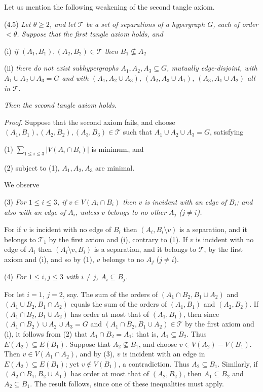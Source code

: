 Let us mention the following weakening of the second tangle axiom.

\stmt
(4.5) \textit{Let $\theta \ge 2$, and let $\mathscr{T}$ be a set of separations of a hypergraph $G$, each of order $< \theta$. Suppose that the first tangle axiom holds, and}

\hspace*{12pt}(i) \textit{if $(A_1, B_1), (A_2, B_2) \in \mathscr{T}$ then $B_1 \not\subseteq A_2$}

\hspace*{12pt}(ii) \textit{there do not exist subhypergraphs $A_1, A_2, A_3 \subseteq G$, mutually edge-disjoint, with $A_1 \cup A_2 \cup A_3 = G$ and with $(A_1, A_2 \cup A_3)$, $(A_2, A_3 \cup A_1)$, $(A_3, A_1 \cup A_2)$ all in $\mathscr{T}$.}

\textit{Then the second tangle axiom holds.}

\textit{Proof.} Suppose that the second axiom fails, and choose $(A_1, B_1), (A_2, B_2), (A_3, B_3) \in \mathscr{T}$ such that $A_1 \cup A_2 \cup A_3 = G$, satisfying

\hspace*{12pt}(1) $\sum_{1 \le i \le 3} |V(A_i \cap B_i)|$ is minimum, and

\hspace*{12pt}(2) subject to (1), $A_1, A_2, A_3$ are minimal.

We observe

\hspace*{12pt}(3) \textit{For $1 \le i \le 3$, if $v \in V(A_i \cap B_i)$ then $v$ is incident with an edge of $B_i$; and also with an edge of $A_i$, unless $v$ belongs to no other $A_j$ ($j \ne i$).}

For if $v$ is incident with no edge of $B_i$ then $(A_i, B_i \setminus v)$ is a separation, and it belongs to $\mathscr{T}_1$ by the first axiom and (i), contrary to (1). If $v$ is incident with no edge of $A_i$ then $(A_i \setminus v, B_i)$ is a separation, and it belongs to $\mathscr{T}$, by the first axiom and (i), and so by (1), $v$ belongs to no $A_j$ ($j \ne i$).

\hspace*{12pt}(4) \textit{For $1 \le i, j \le 3$ with $i \ne j$, $A_i \subseteq B_j$.}

For let $i = 1$, $j = 2$, say. The sum of the orders of $(A_1 \cap B_2, B_1 \cup A_2)$ and $(A_1 \cup B_2, B_1 \cap A_2)$ equals the sum of the orders of $(A_1, B_1)$ and $(A_2, B_2)$. If $(A_1 \cap B_2, B_1 \cup A_2)$ has order at most that of $(A_1, B_1)$, then since $(A_1 \cap B_2) \cup A_2 \cup A_3 = G$ and $(A_1 \cap B_2, B_1 \cup A_2) \in \mathscr{T}$ by the first axiom and (i), it follows from (2) that $A_1 \cap B_2 = A_1$; that is, $A_1 \subseteq B_2$. Thus $E(A_2) \subseteq E(B_1)$. Suppose that $A_2 \not\subseteq B_1$, and choose $v \in V(A_2) - V(B_1)$. Then $v \in V(A_1 \cap A_2)$, and by (3), $v$ is incident with an edge in $E(A_2) \subseteq E(B_1)$; yet $v \notin V(B_1)$, a contradiction. Thus $A_2 \subseteq B_1$. Similarly, if $(A_2 \cap B_1, B_2 \cup A_1)$ has order at most that of $(A_2, B_2)$, then $A_1 \subseteq B_2$ and $A_2 \subseteq B_1$. The result follows, since one of these inequalities must apply.

